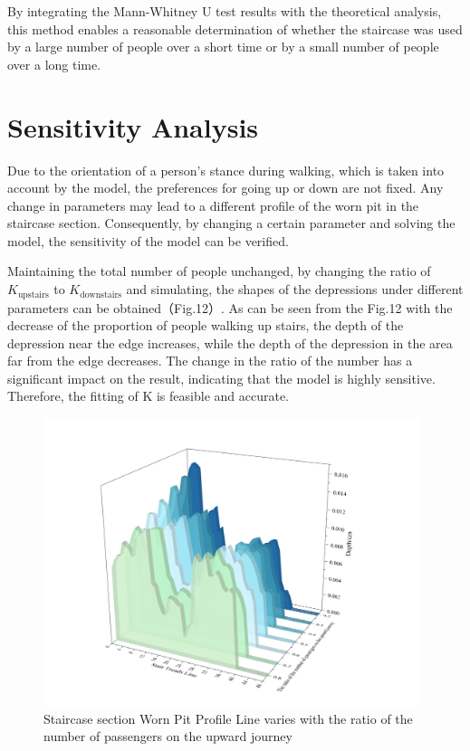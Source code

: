 \documentclass{mcmthesis}
\begin{document}
By integrating the Mann-Whitney U test results with the theoretical analysis, this method enables a reasonable determination of whether the staircase was used by a large number of people over a short time or by a small number of people over a long time.


\section{Sensitivity Analysis}

Due to the orientation of a person's stance during walking, which is taken into account by the model, the preferences for going up or down are not fixed. Any change in parameters may lead to a different profile of the worn pit in the staircase section. Consequently, by changing a certain parameter and solving the model, the sensitivity of the model can be verified.

Maintaining the total number of people unchanged, by changing the ratio of $K_{\text{upstairs}}$ to $K_{\text{downstairs}}$ and simulating, the shapes of the depressions under different parameters can be obtained（Fig.12）.
As can be seen from the Fig.12 with the decrease of the proportion of people walking up stairs, the depth of the depression near the edge increases, while the depth of the depression in the area far from the edge decreases. The change in the ratio of the number has a significant impact on the result, indicating that the model is highly sensitive. Therefore, the fitting of K is feasible and accurate.

\begin{figure}[h]  %
  \small
  \centering  %
  \includegraphics[width=11cm]{14-Staircase section Worn Pit Profile Line varies with the ratio of the number of passengers on the upward journey..png}
  \caption{Staircase section Worn Pit Profile Line varies with the ratio of the number of passengers on the upward journey} \label{fig:2}  %
  \end{figure}  %
\end{document}
